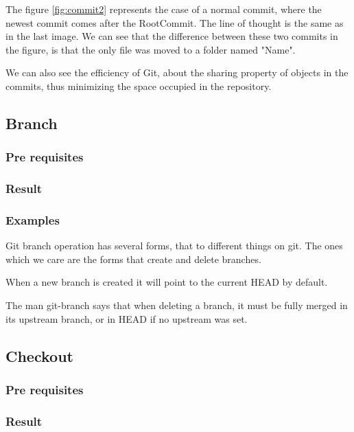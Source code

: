 The figure \ref{fig:commit2} represents the case of a normal commit, where the
newest commit comes after the RootCommit. The line of thought is the same as in
the last image. We can see that the difference between these two commits in the
figure, is that the only file was moved to a folder named "Name". \par
We can also see the efficiency of Git, about the sharing property of objects in
the commits, thus minimizing the space occupied in the repository. \par
\subsection{Branch}

\subsubsection{Pre requisites}

\subsubsection{Result}

\subsubsection{Examples}
Git branch operation has several forms, that to different things on git.
The ones which we care are the forms that create and delete branches. \par
When a new branch is created it will point to the current HEAD by default.
\par


The man git-branch says that when deleting a branch, it must be fully
merged in its upstream branch, or in HEAD if no upstream was set. \par


\subsection{Checkout}

\subsubsection{Pre requisites}

\subsubsection{Result}

